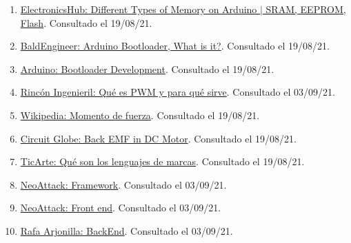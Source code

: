 \documentclass[12pt]{article}
\begin{document}
\begin{enumerate}
			\item 
			\label{bib: electronicsHub arduino memory}
			\href{https://www.electronicshub.org/types-of-memory-on-arduino/#Volatile_vs_Non-Volatile}{ElectronicsHub: Different Types of Memory on Arduino $\vert$ SRAM, EEPROM, Flash}. Consultado el 19/08/21.
			
			\item 
			\label{bib: baldEngineer arduino bootloader}
			\href{https://www.baldengineer.com/arduino-bootloader.html}{BaldEngineer: Arduino Bootloader, What is it?}. Consultado el 19/08/21.	
			
			\item 
			\label{bib: Arduino cc  bootloader}
			\href{https://www.arduino.cc/en/hacking/bootloader}{Arduino: Bootloader Development}. Consultado el 19/08/21.
			
			\item
			\label{bib: pwm}
			\href{https://www.rinconingenieril.es/que-es-pwm-y-para-que-sirve/}{Rincón Ingenieril: Qué es PWM y para qué sirve}. Consultado el 03/09/21.
			
			\item 
			\label{bib: wikipedia momento de fuerza}
			\href{https://es.wikipedia.org/wiki/Momento_de_fuerza}{Wikipedia: Momento de fuerza}. Consultado el 19/08/21.	
			
			\item 
			\label{bib: circuit globe back emf}
			\href{https://circuitglobe.com/what-is-back-emf-in-dc-motor.html}{Circuit Globe: Back EMF in DC Motor}. Consultado el 19/08/21.	
			
			\item 
			\label{bib: lenguaje marcado definicion}
			\href{https://www.ticarte.com/contenido/que-son-los-lenguajes-de-marcas}{TicArte: Qué son los lenguajes de marcas}. Consultado el 19/08/21.
		
			\item
			\label{neoattack framework}
			\href{https://neoattack.com/neowiki/framework/}{NeoAttack: Framework}. Consultado el 03/09/21.
			
			\item
			\label{bib: neoattack front end}
			\href{https://neoattack.com/neowiki/front-end/}{NeoAttack: Front end}. Consultado el 03/09/21.
			
			\item
			\label{bib: backend}
			\href{https://rafarjonilla.com/que-es/backend/}{Rafa Arjonilla: BackEnd}. Consultado el 03/09/21.
			

			
			
		\end{enumerate}
		
\end{document}

